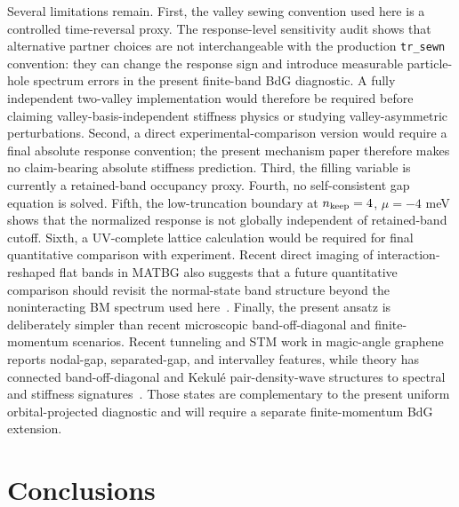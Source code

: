 \documentclass[aps,prb,reprint,superscriptaddress,floatfix,nofootinbib]{revtex4-2}
\begin{document}
Several limitations remain.  First, the valley sewing convention used here is a
controlled time-reversal proxy.  The response-level sensitivity audit shows
that alternative partner choices are not interchangeable with the production
\texttt{tr\_sewn} convention: they can change the response sign and introduce
measurable particle-hole spectrum errors in the present finite-band BdG
diagnostic.  A fully independent two-valley implementation would therefore be
required before claiming valley-basis-independent stiffness physics or
studying valley-asymmetric perturbations.
Second, a direct experimental-comparison version would require a final absolute
response convention; the present mechanism paper therefore makes no
claim-bearing absolute stiffness prediction.  Third, the filling variable is
currently a retained-band occupancy proxy.  Fourth, no self-consistent gap
equation is solved.  Fifth, the low-truncation boundary at
$n_{\rm keep}=4$, $\mu=-4$ meV shows that the normalized response is not
globally independent of retained-band cutoff.  Sixth, a UV-complete lattice
calculation would be required for final quantitative comparison with
experiment.
Recent direct imaging of interaction-reshaped flat bands in MATBG also
suggests that a future quantitative comparison should revisit the normal-state
band structure beyond the noninteracting BM spectrum used here~\cite{xiao_flat_bands_2026}.
Finally, the present ansatz is deliberately simpler than recent microscopic
band-off-diagonal and finite-momentum scenarios.  Recent tunneling and STM
work in magic-angle graphene reports nodal-gap, separated-gap, and intervalley
features, while theory has connected band-off-diagonal and Kekul\'e
pair-density-wave structures to spectral and stiffness
signatures~\cite{park_nodal_gap_2025,kim_intervalley_2026,christos_2023,putzer_2025,wang_levin_kekule_2026,wang_kekule_2026}.
Those states are complementary to the present uniform orbital-projected
diagnostic and will require a separate finite-momentum BdG extension.

\section{Conclusions}
\end{document}
